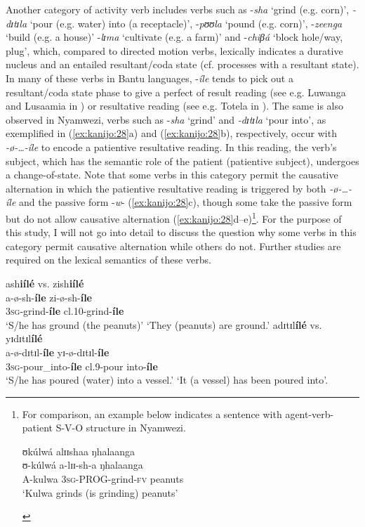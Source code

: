 \documentclass[output=paper,newtxmath,modfonts,nonflat,draftmode]{langsci/langscibook}
\begin{document}
Another category of activity verb includes verbs such as -\textit{sha} ‘grind (e.g. corn)’, \textit{-dɪtɪla} ‘pour (e.g. water) into (a receptacle)’, -\textit{pʊʊla} ‘pound (e.g. corn)’, -\textit{zeenga} ‘build (e.g. a house)’ -\textit{lɪma} ‘cultivate (e.g. a farm)’ and -\textit{chiβá} ‘block hole/way, plug’, which, compared to directed motion verbs, lexically indicates a durative nucleus and an entailed resultant/coda state (cf.  processes with a resultant state). In many of these verbs in Bantu languages, -\textit{íle} tends to pick out a resultant/coda state phase to give a perfect of result reading (see e.g. Luwanga and Lusaamia in \citet{Botne2010}) or resultative reading (see e.g. Totela in \citet{Crane2013}). The same is also observed in Nyamwezi, verbs such as -\textit{sha} ‘grind’ and \textit{-dɪtɪla} ‘pour into’, as exemplified in (\ref{ex:kanijo:28}a) and (\ref{ex:kanijo:28}b), respectively, occur with \textit{-ø-…-íle} to encode a patientive resultative reading. In this reading, the verb’s subject, which has the semantic role of the patient (patientive subject), undergoes a change-of-state. Note that some verbs in this category permit the causative alternation in which the patientive resultative reading is triggered by both \textit{-ø-…-íle} and the passive form -\textit{w}- (\ref{ex:kanijo:28}c), though some take the passive form but do not allow causative alternation (\ref{ex:kanijo:28}d--e)\footnote{For comparison, an example below indicates a sentence with agent-verb-patient S-V-O structure in Nyamwezi.       
\begin{exe}
\ex \glll ʊkúlwá alɪɪshaa ŋhalaanga\\
ʊ-kúlwá  a-lɪɪ-sh-a         ŋhalaanga\\
A-kulwa 3\textsc{sg}-\textsc{PROG}-grind-\textsc{\textsc{fv}} peanuts\\
\glt `Kulwa grinds (is grinding) peanuts'\\
\end{exe}}. For the purpose of this study, I will not go into detail to discuss the question why some verbs in this category permit causative alternation while others do not. Further studies are required on the lexical semantics of these verbs. 

\ea \label{ex:kanijo:28}
\ea
\glll  *ash\textbf{iílé}        vs.   zish\textbf{iílé}\\
\textbf{ }a-ø-sh-\textbf{íle}   {}    zi-ø-sh-\textbf{íle}\\
 3\textsc{sg}-grind-\textbf{íle}  {}      cl.10-grind-\textbf{íle}\\
 \glt ‘S/he has ground (the peanuts)’  {}  ‘They (peanuts) are ground.’
\ex \glll *adɪtɪl\textbf{ílé}      vs.  yɪdɪtɪl\textbf{ílé}\\
a-ø-dɪtɪl-\textbf{íle}   {}   yɪ-ø-dɪtɪl-\textbf{íle}\\
3\textsc{sg}-pour\_into-\textbf{íle}  {}  cl.9-pour into-\textbf{íle}\\
\glt ‘S/he has poured (water) into a vessel.’ {} ‘It (a vessel) has been poured into’.
\end{document}
